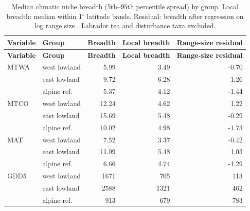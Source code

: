 {\small
\begin{longtable}{llrrr}
\caption{Median climatic niche breadth (5th--95th percentile spread) by group. Local breadth: median within 1$^\circ$ latitude bands. Residual: breadth after regression on log range size \citep{slatyer2013}. Labrador tea and disturbance taxa excluded.}\label{tab:breadth}\\
\toprule
\textbf{Variable} & \textbf{Group} & \textbf{Breadth} & \textbf{Local breadth} & \textbf{Range-size residual} \\
\midrule
\endfirsthead
\toprule
\textbf{Variable} & \textbf{Group} & \textbf{Breadth} & \textbf{Local breadth} & \textbf{Range-size residual} \\
\midrule
\endhead
\bottomrule
\endfoot
MTWA & west lowland & 5.99 & 3.49 & -0.70 \\
 & east lowland & 9.72 & 6.28 & 1.26 \\
 & alpine ref. & 5.37 & 4.12 & -1.44 \\
MTCO & west lowland & 12.24 & 4.62 & 1.22 \\
 & east lowland & 15.69 & 5.48 & -0.29 \\
 & alpine ref. & 10.02 & 4.98 & -1.73 \\
MAT & west lowland & 7.52 & 3.37 & -0.42 \\
 & east lowland & 11.09 & 5.48 & 1.03 \\
 & alpine ref. & 6.66 & 4.74 & -1.29 \\
GDD5 & west lowland & 1671 & 705 & 113 \\
 & east lowland & 2588 & 1321 & 462 \\
 & alpine ref. & 913 & 679 & -783 \\
\end{longtable}
}
